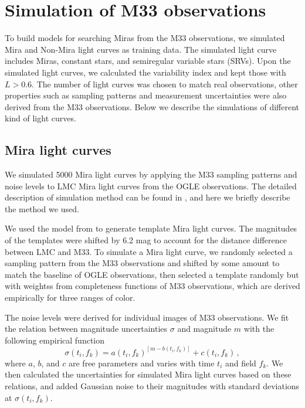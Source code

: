 \section{Simulation of M33 observations} \label{sec.simulation}

To build models for searching Miras from the M33 observations, we simulated Mira and Non-Mira light curves as training data. The simulated light curve includes Miras, constant stars, and semiregular variable stars (SRVs). Upon the simulated light curves, we calculated the variability index and kept those with $L>0.6$. The number of light curves was chosen to match real observations, other properties such as sampling patterns and measurement uncertainties were also derived from the M33 observations. Below we describe the simulations of different kind of light curves.

\subsection{Mira light curves}
We simulated 5000 Mira light curves by applying the M33 sampling patterns and noise levels to LMC Mira light curves from the OGLE observations. The detailed description of simulation method can be found in , and here we briefly describe the method we used. 

We used the model from  to generate template Mira light curves. The magnitudes of the templates were shifted by 6.2 mag to account for the distance difference between LMC and M33. To simulate a Mira light curve, we randomly selected a sampling pattern from the M33 observations and shifted by some amount to match the baseline of OGLE observations, then selected a template randomly but with weightss from completeness functions of M33 observations, which are derived empirically for three ranges of color.

The noise levels were derived for individual images of M33 observations. We fit the relation between magnitude uncertainties $\sigma$ and magnitude $m$ with the following empirical function
\begin{equation}
\sigma(t_i,f_k) = a(t_i,f_k)^{[m-b(t_i,f_k)]} + c(t_i,f_k)\,, \label{equ.sigma.mag}
\end{equation}
where $a$, $b$, and $c$ are free parameters and varies with time $t_i$ and field $f_k$. We then calculated the uncertainties for simulated Mira light curves based on these relations, and added Gaussian noise to their magnitudes with standard deviations at $\sigma(t_i,f_k)$.

